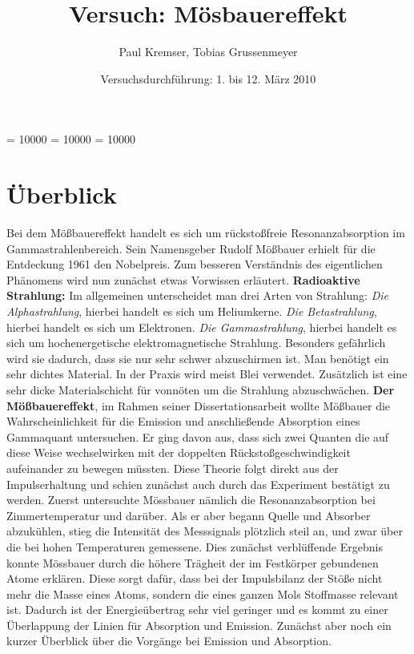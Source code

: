 \documentclass[12pt]{article}
\newcommand{\changefont}[3]{
\fontfamily{#1} \fontseries{#2} \fontshape{#3} \selectfont}
\begin{document}
\clubpenalty = 10000
\widowpenalty = 10000 
\displaywidowpenalty = 10000

\onehalfspacing
\changefont{ptm}{m}{n} 

\begin{titlepage}
\author{Paul Kremser, Tobias Grussenmeyer}
\title{Versuch: Mösbauereffekt}
\date{Versuchsdurchführung: 1. bis 12. März 2010} 
\maketitle
\thispagestyle{empty}
\end{titlepage}


\tableofcontents
\thispagestyle{empty}
\newpage
{}
\section{Überblick}
Bei dem Mößbauereffekt handelt es sich um rückstoßfreie Resonanzabsorption im Gammastrahlenbereich.
Sein Namensgeber Rudolf Mößbauer erhielt für die Entdeckung 1961 den Nobelpreis. Zum besseren Verständnis des
eigentlichen Phänomens wird nun zunächst etwas Vorwissen erläutert.
\textbf{Radioaktive Strahlung:}
Im allgemeinen unterscheidet man drei Arten von Strahlung:
\textit{Die Alphastrahlung}, 
hierbei handelt es sich um Heliumkerne.
\textit{Die Betastrahlung},
hierbei handelt es sich um Elektronen.
\textit{Die Gammastrahlung}, hierbei handelt es sich um hochenergetische elektromagnetische Strahlung.
Besonders gefährlich wird sie dadurch, dass sie nur sehr schwer abzuschirmen ist. Man benötigt ein sehr dichtes Material. In der Praxis
wird meist Blei verwendet. Zusätzlich ist eine sehr dicke Materialschicht für vonnöten um die Strahlung abzuschwächen.
\newline
\textbf{Der Mößbauereffekt},
im Rahmen seiner Dissertationsarbeit wollte Mößbauer die Wahrscheinlichkeit für die Emission und anschließende Absorption eines Gammaquant untersuchen.
Er ging davon aus, dass sich zwei Quanten die auf diese Weise wechselwirken mit der doppelten Rückstoßgeschwindigkeit aufeinander zu bewegen müssten.
Diese Theorie folgt direkt aus der Impulserhaltung und schien zunächst auch durch das Experiment bestätigt zu werden. Zuerst untersuchte Mössbauer nämlich die
Resonanzabsorption bei Zimmertemperatur und darüber. Als er aber begann Quelle und Absorber abzukühlen, stieg die Intensität des Messsignals plötzlich steil an,
und zwar über die bei hohen Temperaturen gemessene. Dies zunächst verblüffende Ergebnis konnte Mössbauer durch die höhere Trägheit der im Festkörper
gebundenen Atome erklären. Diese sorgt dafür, dass bei der Impulsbilanz der Stöße nicht mehr die Masse eines Atoms, sondern die eines ganzen Mols Stoffmasse 
relevant ist. Dadurch ist der Energieübertrag sehr viel geringer und es kommt zu einer Überlappung der Linien für Absorption und Emission. Zunächst aber noch ein
kurzer Überblick über die Vorgänge bei Emission und Absorption. 
\end{document}
